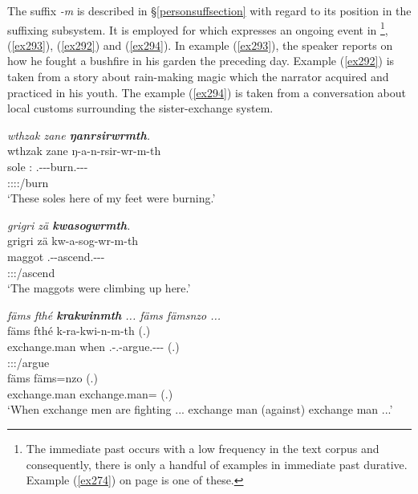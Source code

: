 The  suffix \emph{-m} is described in \S{}\ref{personsuffsection} with regard to its position in the suffixing subsystem. It is employed for   which expresses an ongoing event in \footnote{The immediate past occurs with a low frequency in the text corpus and consequently, there is only a handful of examples in immediate past durative. Example (\ref{ex274}) on page \pageref{ex274} is one of these.},  (\ref{ex293}),  (\ref{ex292}) and  (\ref{ex294}). In example (\ref{ex293}), the speaker reports on how he fought a bushfire in his garden the preceding day. Example (\ref{ex292}) is taken from a story about rain-making magic which the narrator acquired and practiced in his youth. The  example (\ref{ex294}) is taken from a conversation about local customs surrounding the sister-exchange system.

\begin{exe}
	\ex \emph{wthzak zane \textbf{ŋanrsirwrmth}.}\\
	\glll wthzak zane ŋ-a-n-rsir-wr-m-th\\
	sole \Dem:\Prox{} \M.\Alph-\Vc-\Venit-burn.\Ext-\Ndu-\Dur-\Stnsg\\
	{} {} \footnotesize{\Stpl:\Sbj:\Rpst:\Dur:\Venit/burn}\\
	\trans `These soles here of my feet were burning.'
	\label{ex293}
\end{exe}
\begin{exe}
	\ex \emph{grigri zä \textbf{kwasogwrmth}.}\\
	\glll grigri zä kw-a-sog-wr-m-th\\
	maggot \Prox{} \M.\Betatwo-\Vc-ascend.\Ext-\Ndu-\Dur-\Stnsg\\
	{} {} \footnotesize{\Stpl:\Sbj:\Pst:\Dur/ascend}\\
	\trans `The maggots were climbing up here.'
	\label{ex292}
\end{exe}
\begin{exe}
	\ex \emph{fäms fthé \textbf{krakwinmth} ... fäms fämsnzo ...}\\
	\glll fäms fthé k-ra-kwi-n-m-th (.)\\
	exchange.man when \M.\Bet-\Irr.\Vc-argue.\Ext-\Du-\Dur-\Stnsg{} (.)\\
	{} {} \footnotesize{\Stdu:\Sbj:\Irr:\Ipfv/argue} {}\\
	\sn
	\gll fäms fäms=nzo (.)\\
	exchange.man exchange.man=\Only{} (.)\\
	\trans `When exchange men are fighting ... exchange man (against) exchange man ...'
	\label{ex294}
\end{exe}

